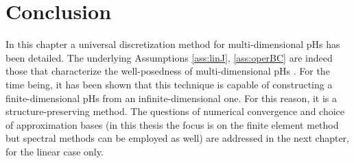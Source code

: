 \section{Conclusion}
In this chapter a universal discretization method for multi-dimensional pHs has been detailed. The underlying Assumptions \ref{ass:linJ}, \ref{ass:operBC} are indeed those that characterize the well-posedness of multi-dimensional pHs \cite{skrepek2019wellposedness}.  For the time being, it has been shown that this technique is capable of constructing a finite-dimensional pHs from an infinite-dimensional one. For this reason, it is a structure-preserving method. The questions of numerical convergence and choice of approximation bases (in this thesis the focus is on the finite element method but  spectral methods can be employed as well) are addressed in the next chapter, for the linear case only.



